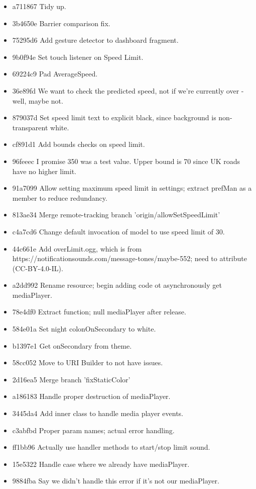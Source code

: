 \documentclass[11pt, a4paper, notitlepage]{report}
\begin{document}
\begin{itemize}
	\item a711867 Tidy up. 
	\item 3b4650e Barrier comparison fix. 
	\item 75295d6 Add gesture detector to dashboard fragment. 
	\item 9b0f94e Set touch listener on Speed Limit. 
	\item 69224c9 Pad AverageSpeed. 
	\item 36e89fd We want to check the predicted speed, not if we're currently over - well, maybe not. 
	\item 879037d Set speed limit text to explicit black, since background is non-transparent white. 
	\item cf891d1 Add bounds checks on speed limit. 
	\item 96feeec I promise 350 was a test value. Upper bound is 70 since UK roads have no higher limit. 
	\item 91a7099 Allow setting maximum speed limit in settings; extract prefMan as a member to reduce redundancy. 
	\item 813ae34 Merge remote-tracking branch 'origin/allowSetSpeedLimit' 
	\item c4a7cd6 Change default invocation of model to use speed limit of 30. 
	\item 44c661e Add overLimit.ogg, which is from https://notificationsounds.com/message-tones/maybe-552; need to attribute (CC-BY-4.0-IL). 
	\item a2dd992 Rename resource; begin adding code ot asynchronously get mediaPlayer. 
	\item 78e4df0 Extract function; null mediaPlayer after release. 
	\item 584e01a Set night colonOnSecondary to white. 
	\item b1397e1 Get onSecondary from theme. 
	\item 58cc052 Move to URI Builder to not have issues. 
	\item 2d16ea5 Merge branch 'fixStaticColor' 
	\item a186183 Handle proper destruction of mediaPlayer. 
	\item 3445da4 Add inner class to handle media player events. 
	\item c3abfbd Proper param names; actual error handling. 
	\item ff1bb96 Actually use handler methods to start/stop limit sound. 
	\item 15e5322 Handle case where we already have mediaPlayer. 
	\item 9884fba Say we didn't handle this error if it's not our mediaPlayer. 

\end{itemize}
\end{document}
